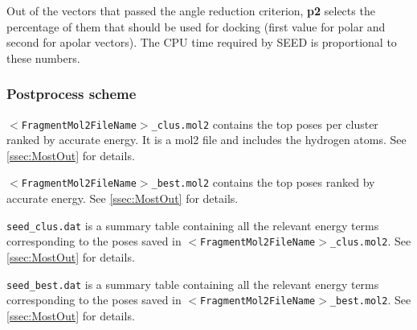 \documentclass[a4paper,12pt,titlepage]{article}
\begin{document}
\noindent
Out of the vectors that passed the angle reduction criterion, \textbf{p2} selects the percentage of them that should be used for docking (first value for polar and second for apolar vectors). The CPU time required by SEED is proportional to these numbers.


\subsubsection{Postprocess scheme}

{\tt $<$FragmentMol2FileName$>$\_clus.mol2} contains the top poses per cluster 
ranked by accurate energy.  It is a mol2 file and includes the hydrogen atoms. See \ref{ssec:MostOut} for details.

\noindent
{\tt $<$FragmentMol2FileName$>$\_best.mol2} contains the top poses 
ranked by accurate energy. See \ref{ssec:MostOut} for details.

\noindent
\texttt{seed\_clus.dat} is a summary table containing all the relevant energy terms corresponding to the poses saved in {\tt $<$FragmentMol2FileName$>$\_clus.mol2}. See \ref{ssec:MostOut} for details.

\noindent
\texttt{seed\_best.dat} is a summary table containing all the relevant energy terms corresponding to the poses saved in {\tt $<$FragmentMol2FileName$>$\_best.mol2}. See \ref{ssec:MostOut} for details.



\end{document}
